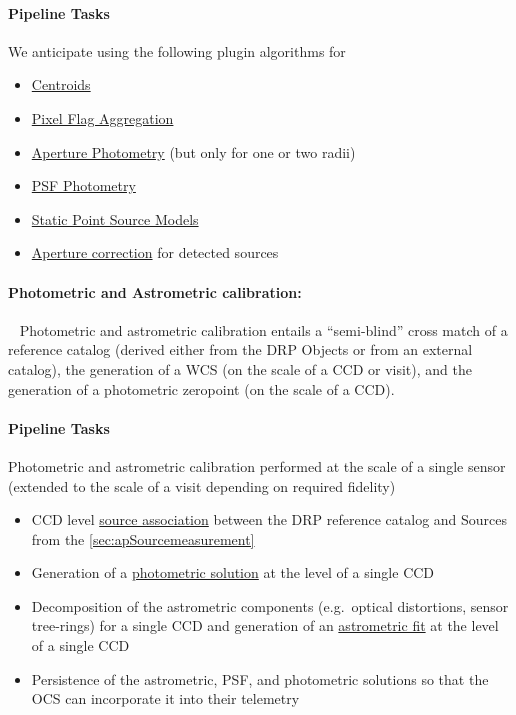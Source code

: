 \paragraph{Pipeline Tasks}
We anticipate using the following plugin algorithms for \label{sec:drpMeasureSources}
\begin{itemize}
\item \hyperref[sec:acCentroidAlgorithms]{Centroids}
\item \hyperref[sec:acPixelFlags]{Pixel Flag Aggregation}
\item \hyperref[sec:acAperturePhotometry]{Aperture Photometry} (but only for one or two radii) 
\item \hyperref[sec:acPSFPhotometry]{PSF Photometry} 
\item \hyperref[sec:acStaticPointSourceModels]{Static Point Source Models}
\item  \hyperref[sec:apertureCorrection]{Aperture correction} for  detected sources
\end{itemize}

\paragraph{Photometric and Astrometric calibration:}~
Photometric and astrometric calibration entails a ``semi-blind'' cross match of a reference catalog (derived either from the DRP Objects or from an external catalog), the generation of a WCS (on the scale of a CCD or visit), and the generation of a photometric zeropoint (on the scale of a CCD).

\paragraph{Pipeline Tasks}
Photometric and astrometric calibration performed at the scale of a
single sensor (extended to the scale of a visit depending on required fidelity)
\begin{itemize}
\item CCD level \hyperref[sec:acSingleCCDReferenceMatching]{source
    association} between the DRP reference catalog and Sources from the \ref{sec:apSourcemeasurement}
\item Generation of a \hyperref[sec:acSingleCCDPhotometricFit]{photometric solution} at the level of a single CCD
\item Decomposition of the astrometric components (e.g.\ optical distortions, sensor tree-rings) for a single CCD and generation of an \hyperref[sec:acSingleCCDAstrometricFit]{astrometric fit} at the level of a single CCD
\item Persistence of the astrometric, PSF, and photometric solutions so that the OCS can incorporate it into their telemetry
\end{itemize}

